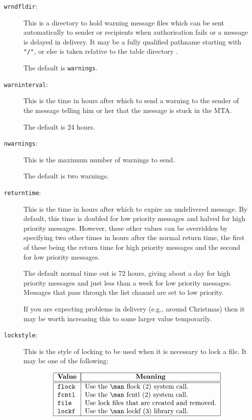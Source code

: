 \begin{description}
\item[\verb+wrndfldir+:]
This is a directory to hold warning message files which can be sent
automatically to sender or recipients when authorisation fails or a
message is delayed in delivery.  It may be a fully qualified pathname
starting with \verb+"/"+, or else is taken relative to the table
directory .

The default is \verb+warnings+.

\item[\verb+warninterval+:]
This is the time in hours after which to send a warning to the sender
of the message telling him or her that the message is stuck in the MTA.

The default is 24 hours.

\item[\verb+nwarnings+:]
This is the maximum number of warnings to send.

The default is two warnings.

\item[\verb+returntime+:]
This is the time in hours after which to expire an undelivered
message.  By default, this time is doubled for low priority messages
and halved for high priority messages. However, these other values can
be overridden by specifying two other times in hours after the normal
return time, the first of these being the return time for high
priority messages and the second for low priority messages.

The default normal time out is 72 hours, giving about a day for high
priority messages and just less than a week for low priority messages.
Messages that pass through the list channel are set to low priority.

If you are expecting problems in delivery (e.g., around Christmas)
then it may be worth increasing this to some larger value temporarily.

\item[\verb+lockstyle+:]
This is the style of locking to be used when it is necessary to lock a file.
It may be one of the following:

\[\begin{tabular}{| l | l |}
\hline
	\multicolumn{1}{|c|}{\bf Value} &
		\multicolumn{1}{|c|}{\bf Meaning} \\
\hline\hline
	\tt flock&	Use the \man flock (2) system call. \\
	\tt fcntl&	Use the \man fcntl (2) system call. \\
	\tt file&	Use lock files that are created and removed.\\
	\tt lockf&	Use the \man lockf (3) library call. \\
\hline
\end{tabular}\]


\end{description}
